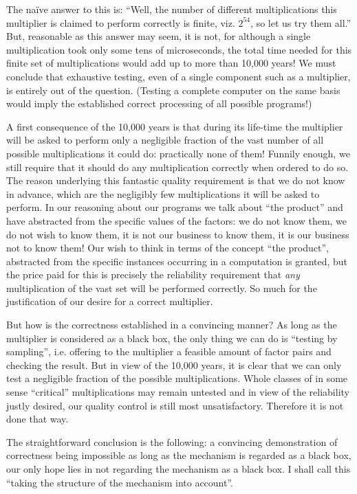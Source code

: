 \documentclass[twoside,11pt]{book}
\begin{document}
The naïve answer to this is: ``Well, the number of different multiplications this multiplier is claimed to perform correctly is finite, viz. $2^{54}$, so let us try them all.'' But, reasonable as this answer may seem, it is not, for although a single multiplication took only some tens of microseconds, the total time needed for this finite set of multiplications would add up to more than 10,000 years! We must conclude that exhaustive testing, even of a single component such as a multiplier, is entirely out of the question. (Testing a complete computer on the same basis would imply the established correct processing of all possible programs!)

A first consequence of the 10,000 years is that during its life-time the multiplier will be asked to perform only a negligible fraction of the vast number of all possible multiplications it could do: practically none of them! Funnily enough, we still require that it should do any multiplication correctly when ordered to do so. The reason underlying this fantastic quality requirement is that we do not know in advance, which are the negligibly few multiplications it will be asked to perform. In our reasoning about our programs we talk about ``the product'' and have abstracted from the specific values of the factors: we do not know them, we do not wish to know them, it is not our business to know them, it is our business not to know them! Our wish to think in terms of the concept ``the product'', abstracted from the specific instances occurring in a computation is granted, but the price paid for this is precisely the reliability requirement that \textit{any} multiplication of the vast set will be performed correctly. So much for the justification of our desire for a correct multiplier.

But how is the correctness established in a convincing manner? As long as the multiplier is considered as a black box, the only thing we can do is ``testing by sampling'', i.e. offering to the multiplier a feasible amount of factor pairs and checking the result. But in view of the 10,000 years, it is clear that we can only test a negligible fraction of the possible multiplications. Whole classes of in some sense ``critical'' multiplications may remain untested and in view of the reliability justly desired, our quality control is still most unsatisfactory. Therefore it is not done that way.

The straightforward conclusion is the following: a convincing demonstration of correctness being impossible as long as the mechanism is regarded
as a black box, our only hope lies in not regarding the mechanism as a black box. I shall call this ``taking the structure of the mechanism into account''.
\end{document}
